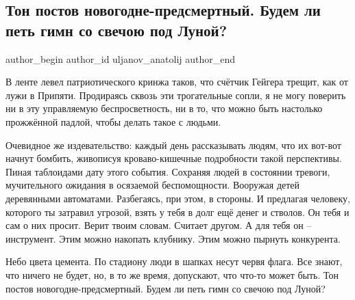  
 
 
 
 
 
\subsection{Тон постов новогодне-предсмертный. Будем ли петь гимн со свечою под Луной?}
\label{sec:16_02_2022.fb.uljanov_anatolij.1.gimn_so_svechoj_pod_lunoj}
 
\ifcmt
 author_begin
   author_id uljanov_anatolij
 author_end
\fi


В ленте левел патриотического кринжа таков, что счётчик Гейгера трещит, как от
лужи в Припяти. Продираясь сквозь эти трогательные сопли, я не могу поверить ни
в эту управляемую беспросветность, ни в то, что можно быть настолько прожжённой
падлой, чтобы делать такое с людьми.

Очевидное же издевательство: каждый день рассказывать людям, что их вот-вот
начнут бомбить, живописуя кроваво-кишечные подробности такой перспективы. Пиная
таблоидами дату этого события. Сохраняя людей в состоянии тревоги, мучительного
ожидания в осязаемой беспомощности. Вооружая детей деревянными автоматами.
Разбегаясь, при этом, в стороны. И предлагая человеку, которого ты затравил
угрозой, взять у тебя в долг ещё денег и стволов. Он тебя и сам о них просит.
Верит твоим словам. Считает другом. А для тебя он – инструмент. Этим можно
накопать клубнику. Этим можно пырнуть конкурента.

Небо цвета цемента. По стадиону люди в шапках несут червя флага. Все знают, что
ничего не будет, но, в то же время, допускают, что что-то может быть. Тон
постов новогодне-предсмертный. Будем ли петь гимн со свечою под Луной?
